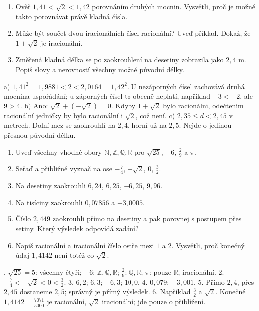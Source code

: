 \documentclass[11pt,a4paper]{article}
\begin{document}

\newpage
{}
\begin{zadaniReseniBox}[title={Rozšíření 1},breakable=false]
\begin{enumerate}[label=\alph*)]
\item Ověř $1{,}41<\sqrt2<1{,}42$ porovnáním druhých mocnin.
Vysvětli, proč je možné takto porovnávat právě kladná čísla.
\item Může být součet dvou iracionálních čísel racionální?
Uveď příklad. Dokaž, že $1+\sqrt2$ je iracionální.
\item Změřená kladná délka se po zaokrouhlení na desetiny zobrazila
jako $2{,}4$ m. Popiš slovy a nerovností všechny možné původní délky.
\end{enumerate}
\tcblower
a) $1{,}41^2=1{,}9881<2<2{,}0164=1{,}42^2$.
U nezáporných čísel zachovává druhá mocnina uspořádání; u záporných
čísel to obecně neplatí, například $-3<-2$, ale $9>4$.
b) Ano: $\sqrt2+(-\sqrt2)=0$. Kdyby $1+\sqrt2$ bylo racionální,
odečtením racionální jedničky by bylo racionální i $\sqrt2$, což není.
c) $2{,}35\le d<2{,}45$ v metrech. Dolní mez se zaokrouhlí na $2{,}4$,
horní už na $2{,}5$. Nejde o jedinou přesnou původní délku.
\end{zadaniReseniBox}

\begin{zadaniReseniBox}[title={Domácí úkol},breakable=false]
\begin{enumerate}[label=\arabic*)]
\item Uveď všechny vhodné obory $\mathbb N,\mathbb Z,\mathbb Q,\mathbb R$
pro $\sqrt{25}$, $-6$, $\frac29$ a $\pi$.
\item Seřaď a přibližně vyznač na ose $-\frac74$, $-\sqrt2$, $0$, $\frac32$.
\item Na desetiny zaokrouhli $6{,}24$, $6{,}25$, $-6{,}25$, $9{,}96$.
\item Na tisíciny zaokrouhli $0{,}07856$ a $-3{,}0005$.
\item Číslo $2{,}449$ zaokrouhli přímo na desetiny a pak porovnej s postupem
přes setiny. Který výsledek odpovídá zadání?
\item Napiš racionální a iracionální číslo ostře mezi $1$ a $2$.
Vysvětli, proč konečný údaj $1{,}4142$ není totéž co $\sqrt2$.
\end{enumerate}
. $\sqrt{25}=5$: všechny čtyři; $-6$: $\mathbb Z,\mathbb Q,\mathbb R$;
$\frac29$: $\mathbb Q,\mathbb R$; $\pi$: pouze $\mathbb R$, iracionální.
2. $-\frac74<-\sqrt2<0<\frac32$.
3. $6{,}2$; $6{,}3$; $-6{,}3$; $10{,}0$.
4. $0{,}079$; $-3{,}001$.
5. Přímo $2{,}4$, přes $2{,}45$ dostaneme $2{,}5$; správný je přímý výsledek.
6. Například $\frac32$ a $\sqrt2$. Konečné $1{,}4142=\frac{7071}{5000}$
je racionální, $\sqrt2$ iracionální; jde pouze o přiblížení.
\end{zadaniReseniBox}
\end{document}
